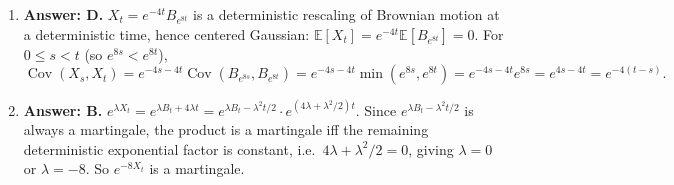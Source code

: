 \documentclass[11pt]{article}
\newcommand{\E}{\mathbb{E}}
\DeclareMathOperator{\Cov}{Cov}
\newcommand{\ans}[1]{\par\noindent\textbf{\color{blue!50!black}Answer: #1}}
\begin{document}
\begin{enumerate}
\item[\textbf{Q15.}] \ans{D.} $X_t=e^{-4t}B_{e^{8t}}$ is a deterministic rescaling of Brownian motion at a deterministic time, hence centered Gaussian: $\E[X_t]=e^{-4t}\E[B_{e^{8t}}]=0$. For $0\le s<t$ (so $e^{8s}<e^{8t}$),
\[
\Cov(X_s,X_t)=e^{-4s-4t}\Cov(B_{e^{8s}},B_{e^{8t}})=e^{-4s-4t}\min(e^{8s},e^{8t})=e^{-4s-4t}e^{8s}=e^{4s-4t}=e^{-4(t-s)}.
\]

\item[\textbf{Q16.}] \ans{B.} $e^{\lambda X_t}=e^{\lambda B_t+4\lambda t}=e^{\lambda B_t-\lambda^2t/2}\cdot e^{(4\lambda+\lambda^2/2)t}$. Since $e^{\lambda B_t-\lambda^2t/2}$ is always a martingale, the product is a martingale iff the remaining deterministic exponential factor is constant, i.e.\ $4\lambda+\lambda^2/2=0$, giving $\lambda=0$ or $\lambda=-8$. So $e^{-8X_t}$ is a martingale.

\end{enumerate}
\end{document}
